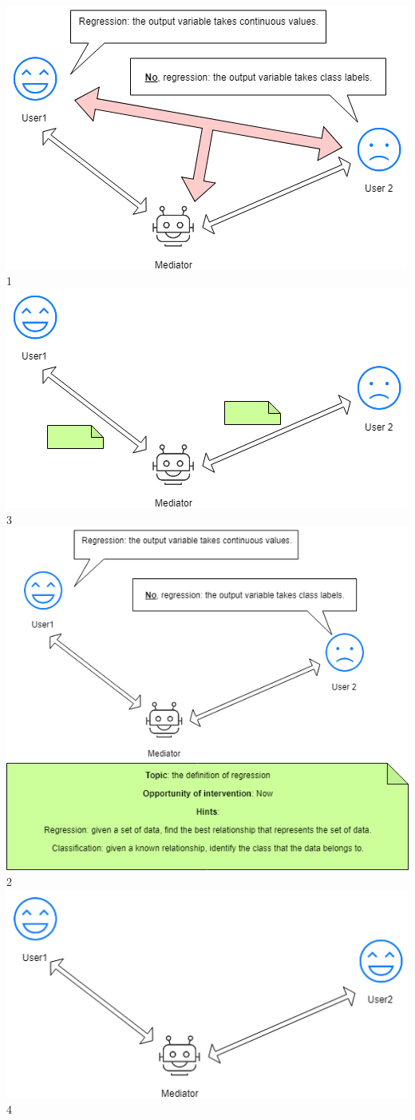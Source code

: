\documentclass{beamer}
\begin{document}
\begin{frame}
\begin{columns}[t]
	\includegraphics[width=.8\columnwidth]{p3}
 1
	\includegraphics[width=.8\columnwidth]{p5}
3
	\includegraphics[width=.8\columnwidth]{p4}
2
	\includegraphics[width=.8\columnwidth]{p6}
4

\end{columns}


\end{frame}
\end{document}
